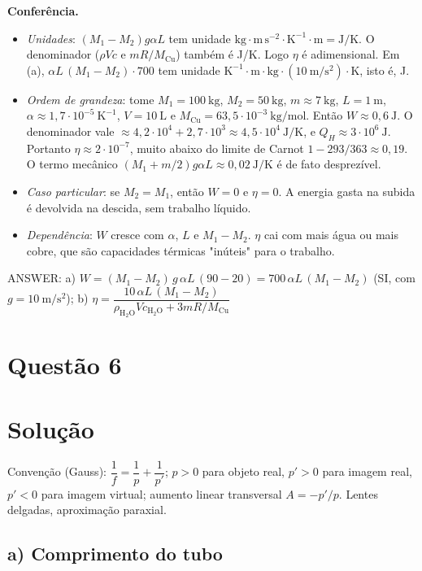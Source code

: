 \documentclass{article}%
\begin{document}
\medskip
\textbf{Conferência.}
\begin{itemize}
\item \emph{Unidades}: $(M_1-M_2)g\alpha L$ tem unidade $\mathrm{kg\cdot m\,s^{-2}\cdot K^{-1}\cdot m}=\mathrm{J/K}$. O denominador ($\rho Vc$ e $mR/M_{\mathrm{Cu}}$) também é J/K. Logo $\eta$ é adimensional. Em (a), $\alpha L\,(M_1-M_2)\cdot 700$ tem unidade $\mathrm{K^{-1}\cdot m\cdot kg\cdot(10\ m/s^2)\cdot K}$, isto é, J.
\item \emph{Ordem de grandeza}: tome $M_1=100\ \mathrm{kg}$, $M_2=50\ \mathrm{kg}$, $m\approx7\ \mathrm{kg}$, $L=1\ \mathrm{m}$, $\alpha\approx1{,}7\cdot10^{-5}\ \mathrm{K^{-1}}$, $V=10\ \mathrm{L}$ e $M_{\mathrm{Cu}}=63{,}5\cdot10^{-3}\ \mathrm{kg/mol}$. Então $W\approx0{,}6\ \mathrm{J}$. O denominador vale $\approx4{,}2\cdot10^{4}+2{,}7\cdot10^{3}\approx4{,}5\cdot10^{4}\ \mathrm{J/K}$, e $Q_H\approx3\cdot10^{6}\ \mathrm{J}$. Portanto $\eta\approx2\cdot10^{-7}$, muito abaixo do limite de Carnot $1-293/363\approx0{,}19$. O termo mecânico $(M_1+m/2)g\alpha L\approx0{,}02\ \mathrm{J/K}$ é de fato desprezível.
\item \emph{Caso particular}: se $M_2=M_1$, então $W=0$ e $\eta=0$. A energia gasta na subida é devolvida na descida, sem trabalho líquido.
\item \emph{Dependência}: $W$ cresce com $\alpha$, $L$ e $M_1-M_2$. $\eta$ cai com mais água ou mais cobre, que são capacidades térmicas "inúteis" para o trabalho.
\end{itemize}

ANSWER: a) $W=(M_1-M_2)\,g\,\alpha L\,(90-20)=700\,\alpha L\,(M_1-M_2)$ (SI, com $g=10\ \mathrm{m/s^2}$); b) $\eta=\dfrac{10\,\alpha L\,(M_1-M_2)}{\rho_{\mathrm{H_2O}}V c_{\mathrm{H_2O}}+3mR/M_{\mathrm{Cu}}}$%
\newpage%
\section*{Questão 6}

\section*{Solução}

Convenção (Gauss): $\dfrac1f=\dfrac1p+\dfrac1{p'}$; $p>0$ para objeto real, $p'>0$ para imagem real, $p'<0$ para imagem virtual; aumento linear transversal $A=-p'/p$. Lentes delgadas, aproximação paraxial.

\subsection*{a) Comprimento do tubo}
\end{document}
